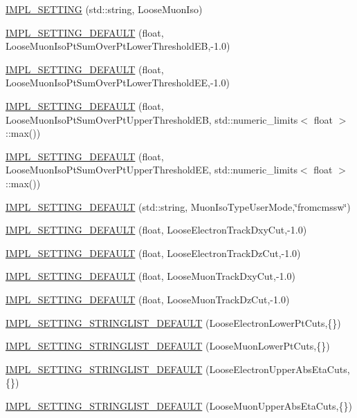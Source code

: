 \begin{DoxyCompactItemize}
\hyperlink{classHttSettings_a4d9b0df2ccdc94ae57c6a9c0a1351066}{IMPL\_\-SETTING} (std::string, LooseMuonIso)
\item 
\hyperlink{classHttSettings_abb033778d9ca77b1c67a43307bf38d87}{IMPL\_\-SETTING\_\-DEFAULT} (float, LooseMuonIsoPtSumOverPtLowerThresholdEB,-\/1.0)
\item 
\hyperlink{classHttSettings_ad73987fd2167fe4486157affa5344f1b}{IMPL\_\-SETTING\_\-DEFAULT} (float, LooseMuonIsoPtSumOverPtLowerThresholdEE,-\/1.0)
\item 
\hyperlink{classHttSettings_aa4be3ae364fa0015bb78ac25abbdb237}{IMPL\_\-SETTING\_\-DEFAULT} (float, LooseMuonIsoPtSumOverPtUpperThresholdEB, std::numeric\_\-limits$<$ float $>$::max())
\item 
\hyperlink{classHttSettings_ac15ce16c8e547817bd419f46fac8ebd9}{IMPL\_\-SETTING\_\-DEFAULT} (float, LooseMuonIsoPtSumOverPtUpperThresholdEE, std::numeric\_\-limits$<$ float $>$::max())
\item 
\hyperlink{classHttSettings_ab08e3e8222e8746782c6151302295352}{IMPL\_\-SETTING\_\-DEFAULT} (std::string, MuonIsoTypeUserMode,\char`\"{}fromcmssw\char`\"{})
\item 
\hyperlink{classHttSettings_a97479bda952e07f2f6b03b5be73d00f2}{IMPL\_\-SETTING\_\-DEFAULT} (float, LooseElectronTrackDxyCut,-\/1.0)
\item 
\hyperlink{classHttSettings_a6db5e1c7f0335291557d4f2b366b77e3}{IMPL\_\-SETTING\_\-DEFAULT} (float, LooseElectronTrackDzCut,-\/1.0)
\item 
\hyperlink{classHttSettings_a12b52ff05d9b9f91e06534e4f59eb39c}{IMPL\_\-SETTING\_\-DEFAULT} (float, LooseMuonTrackDxyCut,-\/1.0)
\item 
\hyperlink{classHttSettings_a373287cc228b1a0f8b92edee173e9ac9}{IMPL\_\-SETTING\_\-DEFAULT} (float, LooseMuonTrackDzCut,-\/1.0)
\item 
\hyperlink{classHttSettings_ad94c7268458dfe8de611c799acca725a}{IMPL\_\-SETTING\_\-STRINGLIST\_\-DEFAULT} (LooseElectronLowerPtCuts,\{\})
\item 
\hyperlink{classHttSettings_af1fc9f51fe6d6291198fd5be598967ee}{IMPL\_\-SETTING\_\-STRINGLIST\_\-DEFAULT} (LooseMuonLowerPtCuts,\{\})
\item 
\hyperlink{classHttSettings_a3f453bcf3bff04e804c16d9219d23850}{IMPL\_\-SETTING\_\-STRINGLIST\_\-DEFAULT} (LooseElectronUpperAbsEtaCuts,\{\})
\item 
\hyperlink{classHttSettings_a05ff7c3b228a631bc3e5b7a0682a57ce}{IMPL\_\-SETTING\_\-STRINGLIST\_\-DEFAULT} (LooseMuonUpperAbsEtaCuts,\{\})

\end{DoxyCompactItemize}
